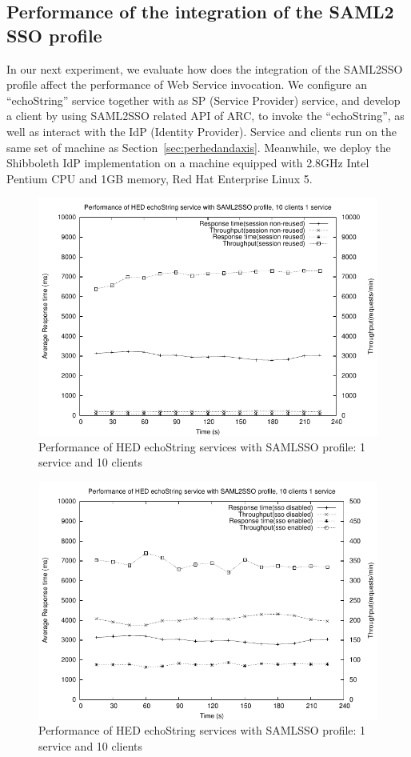 \documentclass[conference]{IEEEtran}
\begin{document}
\subsection{Performance of the integration of the SAML2 SSO profile}
\label{sec:perfsaml2sso}
In our next experiment, we evaluate how does the integration of the SAML2SSO
profile affect the performance of Web Service invocation. We configure an ``echoString'' service
together with as SP (Service Provider) service, and develop a client by using
SAML2SSO related API of ARC, to invoke the ``echoString'', as well as interact with the IdP (Identity Provider).
Service and clients run on the same set of machine as Section~\ref{sec:perhedandaxis}. Meanwhile, we deploy
the Shibboleth IdP implementation on a machine equipped with 2.8GHz Intel Pentium CPU and 1GB
memory, Red Hat Enterprise Linux 5.

\begin{figure}
\includegraphics[width=0.9\columnwidth]{SAML2SSO_thread10_nosso.pdf}
\caption{Performance of HED echoString services with SAMLSSO profile: 1 service
and 10 clients}
\label{fig:SAML2SSO_thread10_nosso}
\end{figure}

\begin{figure}
\includegraphics[width=0.9\columnwidth]{SAML2SSO_thread10_nosso_and_sso.pdf}
\caption{Performance of HED echoString services with SAMLSSO profile: 1 service
and 10 clients}
\label{fig:SAML2SSO_thread10_nosso_and_sso}
\end{figure}
\end{document}
